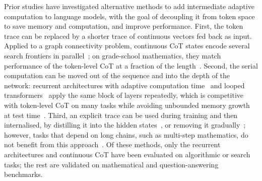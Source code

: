 Prior studies have investigated alternative methods to add intermediate adaptive computation to language models, with the goal of decoupling it from token space to save memory and computation, and improve performance.
First, the token trace can be replaced by a shorter trace of continuous vectors fed back as input.
Applied to a graph connectivity problem, continuous CoT states encode several search frontiers in parallel~\citep{haoTrainingLargeLanguage2025,zhuReasoningSuperpositionTheoretical2025}; on grade-school mathematics, they match performance of the token-level CoT at a fraction of the length~\citep{chengCompressedChainThought2024,shenCODICompressingChainofThought2025,tanThinkSilentlyThink2025,xuSoftCoTSoftChainofThought2025,suTokenAssortedMixing2025}.
Second, the serial computation can be moved out of the sequence and into the depth of the network: recurrent architectures with adaptive computation time~\citep{gravesAdaptiveComputationTime2016,dehghaniUniversalTransformers2019,baninoPonderNetLearningPonder2021} and looped transformers~\citep{giannouLoopedTransformersProgrammable2023,yangLoopedTransformersAre2024,saunshiLoopedTransformers2025,geipingRecurrentDepth2025,baeMixtureofRecursionsLearningDynamic2025} apply the same block of layers repeatedly, which is competitive with token-level CoT on many tasks while avoiding unbounded memory growth at test time~\citep{bansalEndToEndAlgorithm2022, fanLoopedTransformersLength2025,wangHierarchicalReasoningModel2025}.
Third, an explicit trace can be used during training and then internalised, by distilling it into the hidden states~\citep{dengImplicitChainThought2023}, or removing it gradually~\citep{dengExplicitToImplicitCoT2024}; however, tasks that depend on long chains, such as multi-step mathematics, do not benefit from this approach~\citep{yuDistillingSystem2System2024}.
Of these methods, only the recurrent architectures and continuous CoT have been evaluated on algorithmic or search tasks; the rest are validated on mathematical and question-answering benchmarks.

